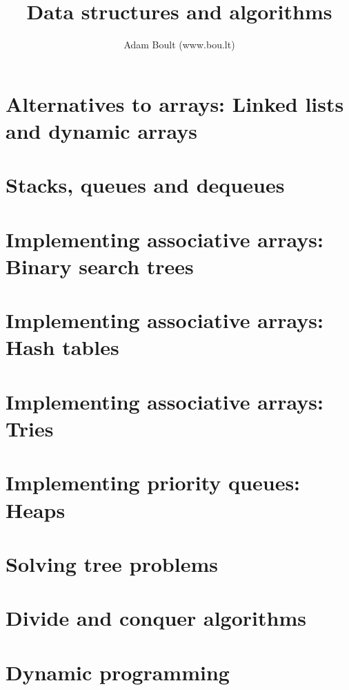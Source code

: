 \documentclass[oneside]{book}
\begin{document}
\author{Adam Boult (www.bou.lt)}
\title{Data structures and algorithms}
\maketitle

\setcounter{tocdepth}{0}
\tableofcontents



\part{Alternatives to arrays: Linked lists and dynamic arrays}




\part{Stacks, queues and dequeues}




\part{Implementing associative arrays: Binary search trees}



\part{Implementing associative arrays: Hash tables}


\part{Implementing associative arrays: Tries}


\part{Implementing priority queues: Heaps}



\part{Solving tree problems}







\part{Divide and conquer algorithms}


\part{Dynamic programming}


\end{document}
